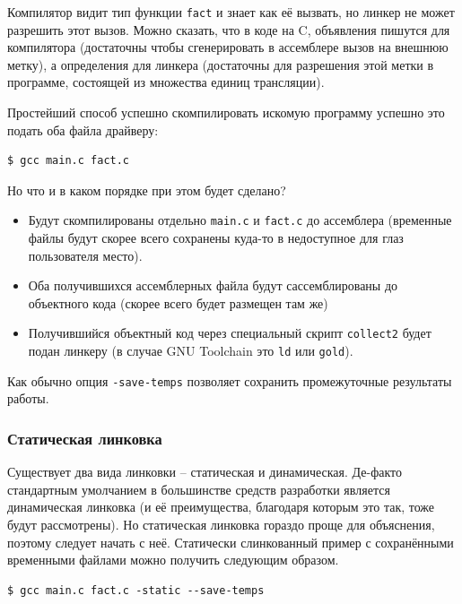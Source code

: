 \documentclass[a4paper,12pt,oneside]{article}
\begin{document}
Компилятор видит тип функции \lstinline!fact! и знает как её вызвать, но линкер не может разрешить этот вызов. Можно сказать, что в коде на C, объявления пишутся для компилятора (достаточны чтобы сгенерировать в ассемблере вызов на внешнюю метку), а определения для линкера (достаточны для разрешения этой метки в программе, состоящей из множества единиц трансляции). 

Простейший способ успешно скомпилировать искомую программу успешно это подать оба файла драйверу:

\begin{verbatim}
$ gcc main.c fact.c
\end{verbatim}

Но что и в каком порядке при этом будет сделано?

\begin{itemize}
\item Будут скомпилированы отдельно \lstinline!main.c! и \lstinline!fact.c! до ассемблера (временные файлы будут скорее всего сохранены куда-то в недоступное для глаз пользователя место).
\item Оба получившихся ассемблерных файла будут сассемблированы до объектного кода (скорее всего будет размещен там же)
\item Получившийся объектный код через специальный скрипт \lstinline!collect2! будет подан линкеру (в случае GNU Toolchain это \lstinline!ld! или \lstinline!gold!).
\end{itemize}

Как обычно опция \lstinline!-save-temps! позволяет сохранить промежуточные результаты работы.

\subsubsection{Статическая линковка}\label{subsubsec:Linking}

Существует два вида линковки -- статическая и динамическая. Де-факто стандартным умолчанием в большинстве средств разработки является динамическая линковка (и её преимущества, благодаря которым это так, тоже будут рассмотрены). Но статическая линковка гораздо проще для объяснения, поэтому следует начать с неё. Статически слинкованный пример с сохранёнными временными файлами можно получить следующим образом.

\begin{verbatim}
$ gcc main.c fact.c -static --save-temps
\end{verbatim}
\end{document}
